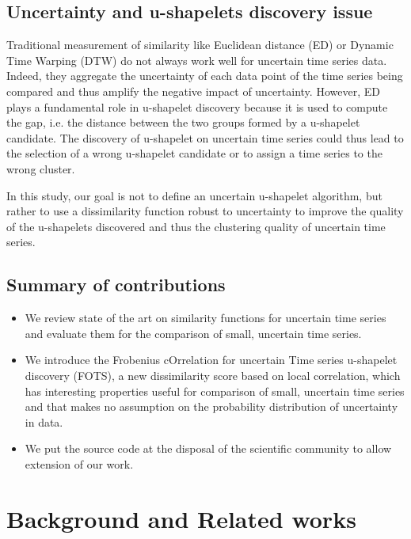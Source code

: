 \subsection{Uncertainty and u-shapelets discovery issue}
Traditional measurement of similarity like Euclidean distance (ED) or Dynamic Time  Warping (DTW) do not always work well for uncertain time series data. Indeed,   they aggregate the uncertainty of each data point of the time series being compared and thus amplify the negative impact of uncertainty. However, ED plays a   fundamental role in u-shapelet discovery because it is used to compute the gap, i.e. the distance between the two groups formed by a u-shapelet candidate. The discovery of u-shapelet on uncertain time series could thus lead to the selection of a wrong u-shapelet candidate or to assign a time series to the wrong cluster.
 
 
 In this study, our goal is not to define an uncertain  u-shapelet algorithm, but rather to use a dissimilarity function robust to uncertainty to improve the quality of the u-shapelets discovered and thus the clustering quality of uncertain time series.
 

\subsection{Summary of contributions}

\begin{itemize}
  \item We review state of the art on similarity functions for uncertain time
  series and evaluate them for the comparison of small, uncertain time series.  
  \item We introduce the Frobenius cOrrelation for uncertain Time series u-shapelet
  discovery (FOTS), a  new dissimilarity score based on local correlation, which
  has interesting properties useful for comparison of small, uncertain  time
  series and that makes no assumption on the probability distribution of
  uncertainty in data.
\item We put the source code at the disposal of the scientific community to allow extension of our work\cite{expe}.
\end{itemize}













\section[Background]{Background and Related works}

